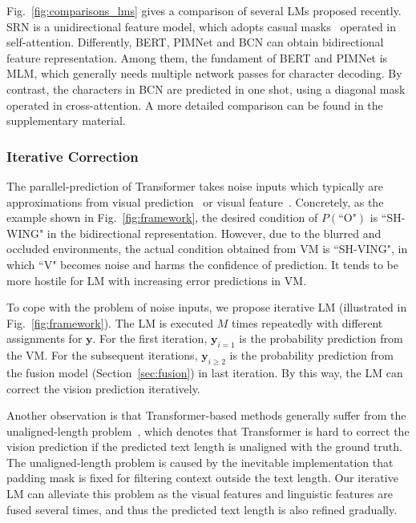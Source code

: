 \documentclass[10pt,journal,compsoc]{IEEEtran}
\begin{document}
Fig.~\ref{fig:comparisons_lms} gives a comparison of several LMs proposed recently. SRN is a unidirectional feature model, which adopts casual masks~\cite{radford2018improving} operated in self-attention. Differently, BERT, PIMNet and BCN can obtain bidirectional feature representation. Among them, the fundament of BERT and PIMNet is MLM, which generally needs multiple network passes for character decoding. By contrast, the characters in BCN are predicted in one shot, using a diagonal mask operated in cross-attention. A more detailed comparison can be found in the supplementary material.


\subsubsection{Iterative Correction}
\label{sec:iterative}


The parallel-prediction of Transformer takes noise inputs which typically are approximations from visual prediction~\cite{yu2020towards} or visual feature~\cite{lyu20192d}. Concretely, as the example shown in Fig.~\ref{fig:framework}, the desired condition of $P(\text{``O"})$ is ``SH-WING" in the bidirectional representation. However, due to the blurred and occluded environments, the actual condition obtained from VM is ``SH-VING", in which ``V" becomes noise and harms the confidence of prediction. It tends to be more hostile for LM with increasing error predictions in VM.


To cope with the problem of noise inputs, we propose iterative LM (illustrated in Fig.~\ref{fig:framework}). The LM is executed $M$ times repeatedly with different assignments for $\bm{y}$. For the first iteration, $\bm{y}_{i=1}$ is the probability prediction from the VM. For the subsequent iterations, $\bm{y}_{i \ge 2}$ is the probability prediction from the fusion model (Section~\ref{sec:fusion}) in last iteration. By this way, the LM can correct the vision prediction iteratively.


Another observation is that Transformer-based methods generally suffer from the unaligned-length problem~\cite{yu2020towards}, which denotes that Transformer is hard to correct the vision prediction if the predicted text length is unaligned with the ground truth. The unaligned-length problem is caused by the inevitable implementation that padding mask is fixed for filtering context outside the text length. Our iterative LM can alleviate this problem as the visual features and linguistic features are fused several times, and thus the predicted text length is also refined gradually.
\end{document}
